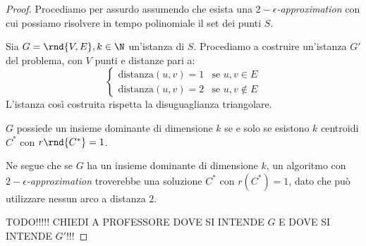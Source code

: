 \documentclass[\main/main.tex]{subfiles}
\begin{document}
\begin{proof}
	Procediamo per assurdo assumendo che esista una \textit{\(2-\epsilon\)-approximation} con cui possiamo risolvere in tempo polinomiale il set dei punti \(S\).

	Sia \(G = \rnd{V, E}, k \in \N \) un'istanza di \(S\). Procediamo a costruire un'istanza \(G'\) del problema, con \(V\) punti e distanze pari a:
	\[
		\begin{cases}
			\text{distanza}(u,v) = 1 & \text{se \(u, v \in E\)}     \\
			\text{distanza}(u,v) = 2 & \text{se \(u, v \not\in E\)}
		\end{cases}
	\]
	L'istanza così costruita rispetta la disuguaglianza triangolare.

	\(G\) possiede un insieme dominante di dimensione \(k\) se e solo se esistono \(k\) centroidi \(C^*\) con \(r\rnd{C^*} = 1\).

	Ne segue che se \(G\) ha un insieme dominante di dimensione \(k\), un algoritmo con \textit{\(2-\epsilon\)-approximation} troverebbe una soluzione \(C^*\) con \(r(C^*) = 1\), dato che può utilizzare nessun arco a distanza \(2\).

	TODO!!!!! CHIEDI A PROFESSORE DOVE SI INTENDE \(G\) E DOVE SI INTENDE \(G'\)!!!
\end{proof}
\end{document}

